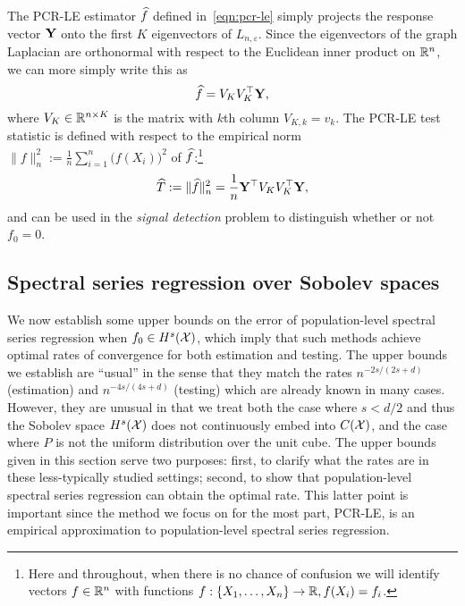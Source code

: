 The PCR-LE estimator $\widehat{f}$ defined in~\eqref{eqn:pcr-le} simply projects the response vector ${\bf Y}$ onto the first $K$ eigenvectors of $L_{n,\varepsilon}$. Since the eigenvectors of the graph Laplacian are orthonormal with respect to the Euclidean inner product on $\mathbb{R}^n$, we can more simply write this as
\begin{equation}
\label{eqn:laplacian_eigenmaps_estimator}
\widehat{f} = V_K V_K^{\top} {\bf Y},
\end{equation} 
where $V_K \in \mathbb{R}^{n \times K}$ is the matrix with $k$th column $V_{K,k} = v_k$. The PCR-LE test statistic is defined with respect to the empirical norm $\|f\|_{n}^2 := \frac{1}{n}\sum_{i = 1}^{n} \bigl(f(X_i)\bigr)^2$ of $\widehat{f}$:\footnote{Here and throughout, when there is no chance of confusion we will identify vectors $f \in \mathbb{R}^n$ with functions $f: \{X_1,\ldots,X_n\} \to \mathbb{R}, f(X_i) = f_i$.}
\begin{equation}
\label{eqn:laplacian_eigenmaps_test}
\widehat{T} := \|\widehat{f}\|_n^2 = \frac{1}{n} {\bf Y}^{\top} V_K V_K^{\top} {\bf Y},
\end{equation}
and can be used in the \emph{signal detection} problem to distinguish whether or not $f_0 = 0$.

\subsection{Spectral series regression over Sobolev spaces}
\label{subsec:spectral_projection}
We now establish some upper bounds on the error of population-level spectral series regression when $f_0 \in H^s(\mathcal{X})$, which imply that such methods achieve optimal rates of convergence for both estimation and testing. The upper bounds we establish are ``usual'' in the sense that they match the rates $n^{-2s/(2s + d)}$ (estimation) and $n^{-4s/(4s + d)}$ (testing) which are already known in many cases. However, they are unusual in that we treat both the case where $s < d/2$ and thus the Sobolev space $H^s(\mathcal{X})$ does not continuously embed into $C(\mathcal{X})$, and the case where $P$ is not the uniform distribution over the unit cube. The upper bounds given in this section serve two purposes: first, to clarify what the rates are in these less-typically studied settings; second, to show that population-level spectral series regression can obtain the optimal rate. This latter point is important since the method we focus on for the most part, PCR-LE, is an empirical approximation to population-level spectral series regression.

